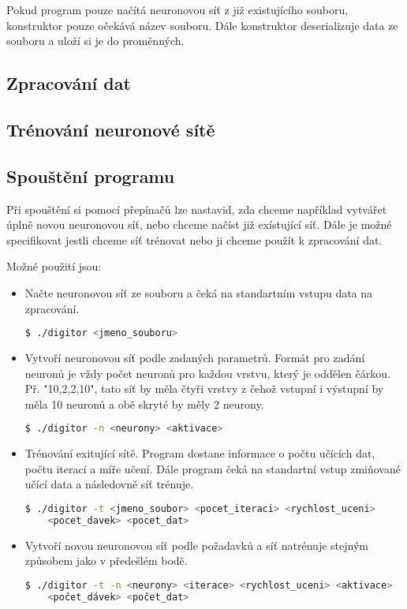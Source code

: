 Pokud program pouze načítá neuronovou síť z již existujícího souboru, konstruktor pouze očekává název souboru.
Dále konstruktor deserializuje data ze souboru a uloží si je do proměnných.

\subsection{Zpracování dat}

\subsection{Trénování neuronové sítě}

\subsection{Spouštění programu}
Při spouštění si pomocí přepínačů lze nastavid, zda chceme například vytvářet úplně novou neuronovou síť, nebo chceme načíst již exístující síť.
Dále je možné specifikovat jestli chceme síť trénovat nebo ji chceme použít k zpracování dat.

Možné použití jsou:
\begin{itemize}
    \item Načte neuronovou síť ze souboru a čeká na standartním vstupu data na zpracování.
    \begin{lstlisting}[language=bash]
$ ./digitor <jmeno_souboru>
    \end{lstlisting}

    \item Vytvoří neuronovou síť podle zadaných parametrů.
    Formát pro zadání neuronů je vždy počet neuronů pro každou vrstvu, který je oddělen čárkou.
    Př. "10,2,2,10", tato síť by měla čtyři vrstvy z čehož vstupní i výstupní by měla 10 neuronů a obě skryté by měly 2 neurony.
    \begin{lstlisting}[language=bash]
$ ./digitor -n <neurony> <aktivace>
    \end{lstlisting}

    \item Trénování exitující sítě. Program dostane informace o počtu učících dat, počtu iterací a míře učení.
    Dále program čeká na standartní vstup zmiňované učící data a následovně síť trénuje.
    \begin{lstlisting}[language=bash]
$ ./digitor -t <jmeno_soubor> <pocet_iteraci> <rychlost_uceni>
    <pocet_davek> <pocet_dat>
    \end{lstlisting}

    \item Vytvoří novou neuronovou síť podle požadavků a síť natrénuje stejným způsobem jako v předešlém bodě.
    \begin{lstlisting}[language=bash, backgroundcolor=\color{backcolor}]
$ ./digitor -t -n <neurony> <iterace> <rychlost_uceni> <aktivace>
    <počet_dávek> <počet_dat>
    \end{lstlisting}
\end{itemize}
